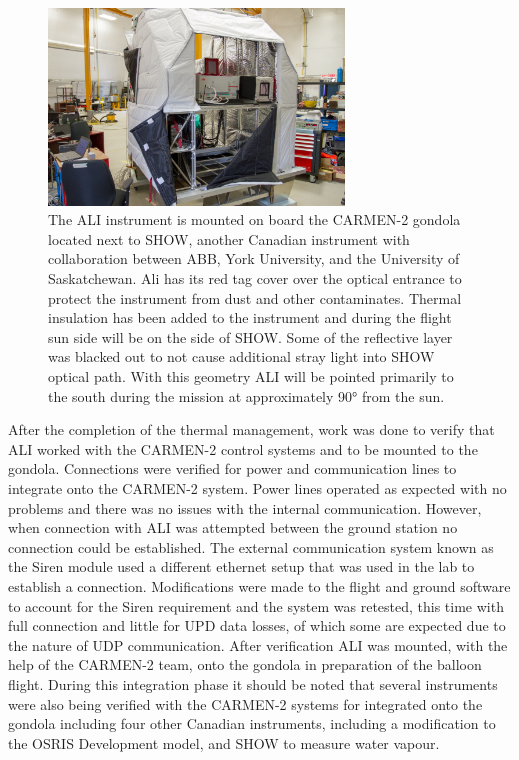  \begin{figure}
    \includegraphics[trim={900 800 500 0},clip,width=0.7\textwidth]{./Images/5-1-AliIntegratedOnCarmen.jpg}
    \caption[ALI Mounted onto the CARMEN-2 Gondola]{The ALI instrument is mounted on board the CARMEN-2 gondola located next to SHOW, another Canadian instrument with collaboration between ABB, York University, and the University of Saskatchewan. Ali has its red tag cover over the optical entrance to protect the instrument from dust and other contaminates. Thermal insulation has been added to the instrument and during the flight sun side will be on the side of SHOW. Some of the reflective layer was blacked out to not cause additional stray light into SHOW optical path. With this geometry ALI will be pointed primarily to the south during the mission at approximately 90\si{\degree} from the sun.}
    \label{fig:5.1:aliIntigratedOnCarmen}
\end{figure}

After the completion of the thermal management, work was done to verify that ALI worked with the CARMEN-2 control systems and to be mounted to the gondola. Connections were verified for power and communication lines to integrate onto the CARMEN-2 system. Power lines operated as expected with no problems and there was no issues with the internal communication. However, when connection with ALI was attempted between the ground station no connection could be established. The external communication system known as the Siren module used a different ethernet setup that was used in the lab to establish a connection. Modifications were made to the flight and ground software to account for the Siren requirement and the system was retested, this time with full connection and little for UPD data losses, of which some are expected due to the nature of UDP communication. After verification ALI was mounted, with the help of the CARMEN-2 team, onto the gondola in preparation of the balloon flight. During this integration phase it should be noted that several instruments were also being verified with the CARMEN-2 systems for integrated onto the gondola including four other Canadian instruments, including a modification to the OSRIS Development model, and SHOW to measure water vapour.

